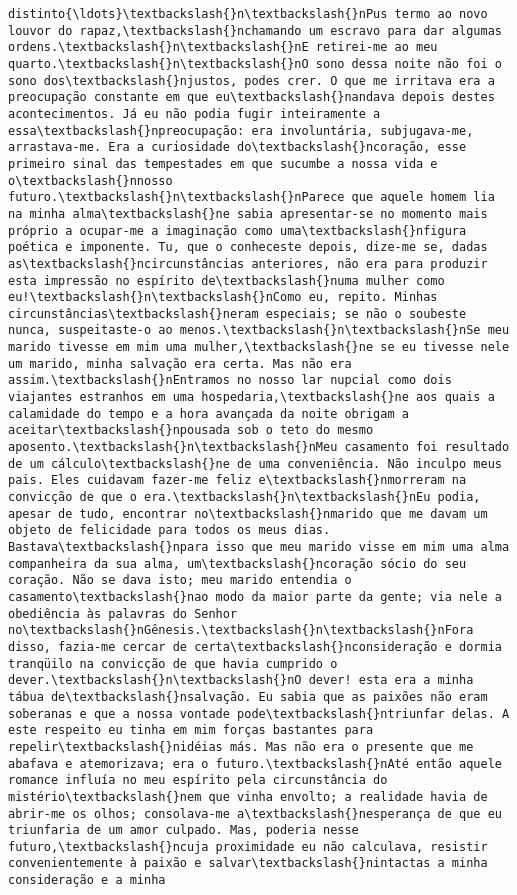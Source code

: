 \documentclass[11pt]{article}
\begin{document}
\begin{Verbatim}[commandchars=\\\{\}]
distinto{\ldots}\textbackslash{}n\textbackslash{}nPus termo ao novo louvor do rapaz,\textbackslash{}nchamando um escravo para dar algumas ordens.\textbackslash{}n\textbackslash{}nE retirei-me ao meu quarto.\textbackslash{}n\textbackslash{}nO sono dessa noite não foi o sono dos\textbackslash{}njustos, podes crer. O que me irritava era a preocupação constante em que eu\textbackslash{}nandava depois destes acontecimentos. Já eu não podia fugir inteiramente a essa\textbackslash{}npreocupação: era involuntária, subjugava-me, arrastava-me. Era a curiosidade do\textbackslash{}ncoração, esse primeiro sinal das tempestades em que sucumbe a nossa vida e o\textbackslash{}nnosso futuro.\textbackslash{}n\textbackslash{}nParece que aquele homem lia na minha alma\textbackslash{}ne sabia apresentar-se no momento mais próprio a ocupar-me a imaginação como uma\textbackslash{}nfigura poética e imponente. Tu, que o conheceste depois, dize-me se, dadas as\textbackslash{}ncircunstâncias anteriores, não era para produzir esta impressão no espírito de\textbackslash{}numa mulher como eu!\textbackslash{}n\textbackslash{}nComo eu, repito. Minhas circunstâncias\textbackslash{}neram especiais; se não o soubeste nunca, suspeitaste-o ao menos.\textbackslash{}n\textbackslash{}nSe meu marido tivesse em mim uma mulher,\textbackslash{}ne se eu tivesse nele um marido, minha salvação era certa. Mas não era assim.\textbackslash{}nEntramos no nosso lar nupcial como dois viajantes estranhos em uma hospedaria,\textbackslash{}ne aos quais a calamidade do tempo e a hora avançada da noite obrigam a aceitar\textbackslash{}npousada sob o teto do mesmo aposento.\textbackslash{}n\textbackslash{}nMeu casamento foi resultado de um cálculo\textbackslash{}ne de uma conveniência. Não inculpo meus pais. Eles cuidavam fazer-me feliz e\textbackslash{}nmorreram na convicção de que o era.\textbackslash{}n\textbackslash{}nEu podia, apesar de tudo, encontrar no\textbackslash{}nmarido que me davam um objeto de felicidade para todos os meus dias. Bastava\textbackslash{}npara isso que meu marido visse em mim uma alma companheira da sua alma, um\textbackslash{}ncoração sócio do seu coração. Não se dava isto; meu marido entendia o casamento\textbackslash{}nao modo da maior parte da gente; via nele a obediência às palavras do Senhor no\textbackslash{}nGênesis.\textbackslash{}n\textbackslash{}nFora disso, fazia-me cercar de certa\textbackslash{}nconsideração e dormia tranqüilo na convicção de que havia cumprido o dever.\textbackslash{}n\textbackslash{}nO dever! esta era a minha tábua de\textbackslash{}nsalvação. Eu sabia que as paixões não eram soberanas e que a nossa vontade pode\textbackslash{}ntriunfar delas. A este respeito eu tinha em mim forças bastantes para repelir\textbackslash{}nidéias más. Mas não era o presente que me abafava e atemorizava; era o futuro.\textbackslash{}nAté então aquele romance influía no meu espírito pela circunstância do mistério\textbackslash{}nem que vinha envolto; a realidade havia de abrir-me os olhos; consolava-me a\textbackslash{}nesperança de que eu triunfaria de um amor culpado. Mas, poderia nesse futuro,\textbackslash{}ncuja proximidade eu não calculava, resistir convenientemente à paixão e salvar\textbackslash{}nintactas a minha consideração e a minha 
\end{Verbatim}
\end{document}
